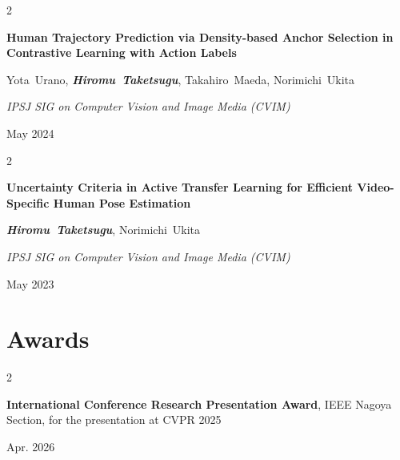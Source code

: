 \documentclass[10pt, letterpaper]{article}
\newenvironment{twocolentry}[2][]{
    \onecolentry
    \def\secondColumn{#2}
    \setcolumnwidth{\fill, 4.5 cm}
    \begin{paracol}{2}
}{
    \switchcolumn \raggedleft \secondColumn
    \end{paracol}
    \endonecolentry
} %
\begin{document}
        \vspace{0.2 cm}

        \begin{samepage}
            \begin{twocolentry}{
                May 2024
            }
                \textbf{Human Trajectory Prediction via Density-based Anchor Selection in Contrastive Learning with Action Labels}

                \vspace{0.10 cm}

                \mbox{Yota Urano}, \mbox{\textbf{\textit{Hiromu Taketsugu}}}, \mbox{Takahiro Maeda}, \mbox{Norimichi Ukita}
                \vspace{0.10 cm}

                \textit{IPSJ SIG on Computer Vision and Image Media (CVIM)}
            \end{twocolentry}
        \end{samepage}

        \vspace{0.2 cm}

        \begin{samepage}
            \begin{twocolentry}{
                May 2023
            }
                \textbf{Uncertainty Criteria in Active Transfer Learning for Efficient Video-Specific Human Pose Estimation}

                \vspace{0.10 cm}

                \mbox{\textbf{\textit{Hiromu Taketsugu}}}, \mbox{Norimichi Ukita}
                \vspace{0.10 cm}

                \textit{IPSJ SIG on Computer Vision and Image Media (CVIM)}
            \end{twocolentry}
        \end{samepage}

    \section{Awards}
        \begin{twocolentry}{
            Apr. 2026}
            {
            \textbf{International Conference Research Presentation Award}, IEEE Nagoya Section, for the presentation at CVPR 2025}
        \end{twocolentry}

        \vspace{0.2 cm}
\end{document}
